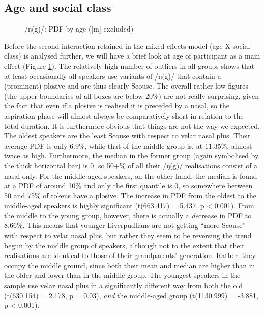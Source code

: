 \subsection{Age and social class}
\label{sec.prod.res.con.ng.ageclass}

\begin{figure}[h]
	\centering
		\resizebox{0.5\linewidth}{!}{} 
	\caption{/ŋ(g)/: PDF by age ([ɪn] excluded)}
	\label{fig.box.ng.tot}
\end{figure}

Before the second interaction retained in the mixed effects model (age X social class) is analysed further, we will have a brief look at age of participant as a main effect (Figure \ref{fig.box.ng.tot}).
The relatively high number of outliers in all groups shows that at least occasionally all speakers use variants of /ŋ(g)/ that contain a (prominent) plosive and are thus clearly Scouse.
The overall rather low figures (the upper boundaries of all boxes are below 20\%) are not really surprising, given the fact that even if a plosive is realised it is preceded by a nasal, so the aspiration phase will almost always be comparatively short in relation to the total duration.
It is furthermore obvious that things are not the way we expected.
The oldest speakers are the least Scouse with respect to velar nasal plus.
Their average PDF is only 6.9\%, while that of the middle group is, at 11.35\%, almost twice as high.
Furthermore, the median in the former group (again symbolised by the thick horizontal bar) is 0, so 50+\% of all their /ŋ(g)/ realisations consist of a nasal only.
For the middle-aged speakers, on the other hand, the median is found at a PDF of around 10\% and only the first quantile is 0, so somewhere between 50 and 75\% of tokens have a plosive.
The increase in PDF from the oldest to the middle-aged speakers is highly significant (t(663.417) = 5.437, p < 0.001).
From the middle to the young group, however, there is actually a \emph{de}crease in PDF to 8.66\%.
This means that younger Liverpudlians are not getting ``more Scouse'' with respect to velar nasal plus, but rather they seem to be reversing the trend begun by the middle group of speakers, although not to the extent that their realisations are identical to those of their grandparents' generation.
Rather, they occupy the middle ground, since both their mean and median are higher than in the older and lower than in the middle group.
The youngest speakers in the sample use velar nasal plus in a significantly different way from both the old (t(630.154) = 2.178, p = 0.03), \emph{and} the middle-aged group (t(1130.999) = -3.881, p < 0.001).

